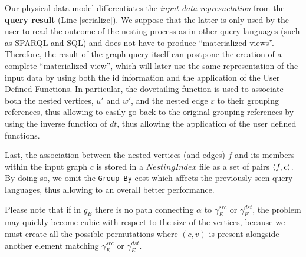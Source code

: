 Our physical data model differentiates the \textit{input data  represnetation} from the \textbf{query result} (Line \ref{serialize}). 
We suppose that the latter is only used by the user to read the outcome of the nesting process as in other  query languages (such as SPARQL and SQL) and does not have to
produce ``materialized views''. Therefore, the result of the graph query itself can postpone the creation of a complete ``materialized view'', which will later use the same representation of the input data by using both the id information and the application of the User Defined Functions. In particular, the dovetailing function is used to associate both the nested vertices, $u'$ and $w'$, and the nested edge $\varepsilon$ to their grouping references, thus allowing to easily go back to the original grouping references by using the inverse function of $dt$, thus allowing the application of the user defined functions.


Last, the association between the nested vertices (and edges) $f$ and its members within the input graph $c$ is stored in a $NestingIndex$ file as a set of pairs $\Braket{f,c}$. By doing so, we omit the \texttt{Group By} cost which affects the previously seen query languages, thus allowing to an overall better performance. 



Please note that if in $g_E$ there is no path connecting $\alpha$ to $\gamma_E^{src}$ or $\gamma_E^{dst}$, the problem may quickly become cubic with respect to the size of the vertices, because we must create all the possible permutations where $(c,v)$ is present alongside another element matching $\gamma_E^{src}$ or $\gamma_E^{dst}$.
